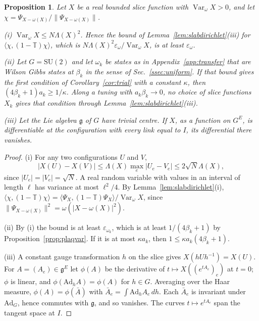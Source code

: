 \documentclass[aps,prd,twocolumn,superscriptaddress,nofootinbib,longbibliography,floatfix,amsmath,amssymb,10pt]{revtex4-2}
\newtheorem{proposition}[theorem]{Proposition}
\theoremstyle{definition}
\theoremstyle{remark}
\newcommand{\SU}{\mathrm{SU}}
\newcommand{\g}{\mathfrak{g}}
\newcommand{\Var}{\operatorname{Var}}
\newcommand{\ip}[2]{\langle #1,#2\rangle}
\begin{document}
\begin{proposition}\label{prop:lipobstruction}
Let $X$ be a real bounded slice function with $\Var_\omega X>0$, and let
$\chi=\Psi_{X-\omega(X)}/\|\Psi_{X-\omega(X)}\|$.

\textup{(i)} $\Var_\omega X\le N\Lambda(X)^2$. Hence the bound of
Lemma~\textup{\ref{lem:slabdirichlet}(iii)} for $\ip\chi{(1-\mathbb
T)\chi}$, which is $N\Lambda(X)^2\varepsilon_\omega/\Var_\omega X$, is at least
$\varepsilon_\omega$.

\textup{(ii)} Let $G=\SU(2)$ and let $\omega_k$ be states as in
Appendix~\textup{\ref{app:transfer}} that are Wilson Gibbs states at $\beta_k$
in the sense of Sec.~\textup{\ref{ssec:uniform}}. If that bound
gives the first condition of Corollary~\textup{\ref{cor:trial}} with a
constant $\kappa$, then $(4\beta_k+1)a_k\ge1/\kappa$. Along a tuning with
$a_k\beta_k\to0$, no choice of slice functions $X_k$ gives that condition
through Lemma~\textup{\ref{lem:slabdirichlet}(iii)}.

\textup{(iii)} Let the Lie algebra $\g$ of $G$ have trivial centre. If $X$,
as a function on $G^E$, is differentiable at the configuration with every
link equal to $I$, its differential there vanishes.
\end{proposition}

\begin{proof}
(i) For any two configurations $U$ and $V$,
\[
|X(U)-X(V)|\le\Lambda(X)\max_e|U_e-V_e|\le2\sqrt N\Lambda(X),
\]
since $|U_e|=|V_e|=\sqrt N$. A real random
variable with values in an interval of length $\ell$ has variance at most
$\ell^2/4$. By Lemma~\ref{lem:slabdirichlet}(i), $\ip\chi{(1-\mathbb T)\chi}=
\ip{\Psi_X}{(1-\mathbb T)\Psi_X}/\Var_\omega X$, since $\|\Psi_{X-\omega(X)}
\|^2=\omega(|X-\omega(X)|^2)$.

(ii) By (i) the bound is at least $\varepsilon_{\omega_k}$, which is at least
$1/(4\beta_k+1)$ by Proposition~\ref{prop:plaqvar}. If it is at most $\kappa
a_k$, then $1\le\kappa a_k(4\beta_k+1)$.

(iii) A constant gauge transformation $h$ on the slice gives $X(hUh^{-1})=
X(U)$. For $A=(A_e)\in\g^E$ let $\phi(A)$ be the derivative of
$t\mapsto X((e^{tA_e})_e)$ at $t=0$; $\phi$ is linear, and
$\phi(\mathrm{Ad}_hA)=\phi(A)$ for $h\in G$. Averaging over the Haar measure,
$\phi(A)=\phi(\bar A)$ with $\bar A_e=\int\mathrm{Ad}_hA_e\,dh$. Each $\bar A_e$
is invariant under $\mathrm{Ad}_G$, hence commutes with $\g$, and so vanishes.
The curves $t\mapsto e^{tA_e}$ span the tangent space at $I$.
\end{proof}
\end{document}
